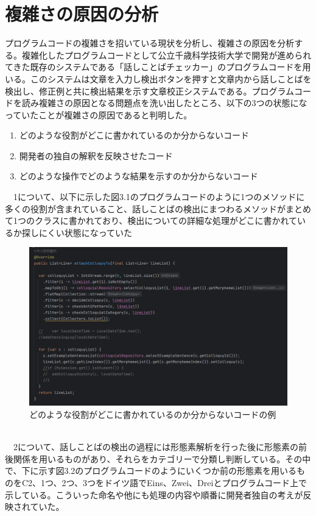\documentclass[11pt, a4paper]{jreport}
\begin{document}
\section{複雑さの原因の分析}
プログラムコードの複雑さを招いている現状を分析し、複雑さの原因を分析する。複雑化したプログラムコードとして公立千歳科学技術大学で開発が進められてきた既存のシステムである「話しことばチェッカー」のプログラムコードを用いる。このシステムは文章を入力し検出ボタンを押すと文章内から話しことばを検出し、修正例と共に検出結果を示す文章校正システムである。プログラムコードを読み複雑さの原因となる問題点を洗い出したところ、以下の3つの状態になっていたことが複雑さの原因であると判明した。
\begin{enumerate}
\item どのような役割がどこに書かれているのか分からないコード
\item 開発者の独自の解釈を反映させたコード
\item どのような操作でどのような結果を示すのか分からないコード
\end{enumerate}
　1について、以下に示した図3.1のプログラムコードのように1つのメソッドに多くの役割が含まれていること、話しことばの検出にまつわるメソッドがまとめて1つのクラスに書かれており、検出についての詳細な処理がどこに書かれているか探しにくい状態になっていた
\begin{figure}
\centering \includegraphics[width=1\linewidth]{image/genin1.png}
\caption{どのような役割がどこに書かれているのか分からないコードの例}
\label{fig:enter-label}
\end{figure}
\\　2について、話しことばの検出の過程には形態素解析を行った後に形態素の前後関係を用いるものがあり、それらをカテゴリーで分類し判断している。その中で、下に示す図3.2のプログラムコードのようにいくつか前の形態素を用いるものをC2、1つ、2つ、3つをドイツ語でEins、Zwei、Dreiとプログラムコード上で示している。こういった命名や他にも処理の内容や順番に開発者独自の考えが反映されていた。
\end{document}

